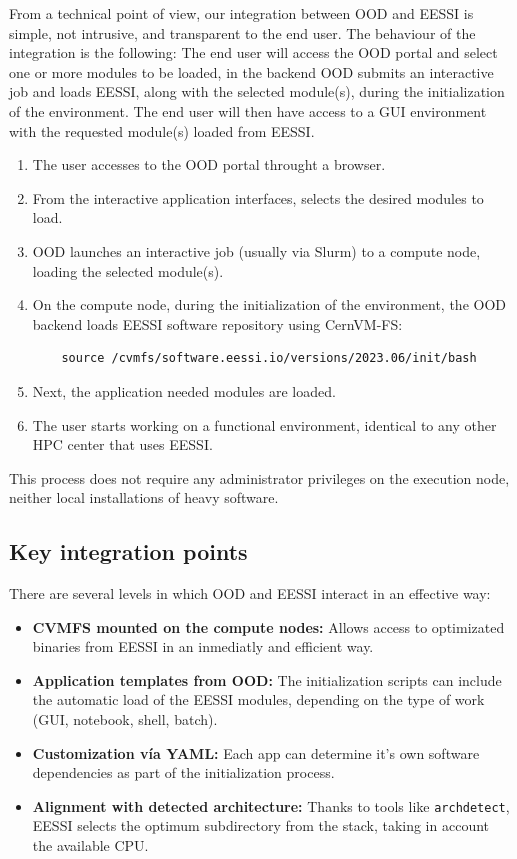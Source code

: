 \documentclass[11pt,a4paper]{article}
\begin{document}
From a technical point of view, our integration between OOD and EESSI is simple, not intrusive, and transparent to the end user. The behaviour of the integration is the following:
The end user will access the OOD portal and select one or more modules to be loaded, in the backend OOD submits an interactive job and loads EESSI, along with the selected module(s), during the initialization of the environment. 
The end user will then have access to a GUI environment with the requested module(s) loaded from EESSI. 
\begin{enumerate}
    \item The user accesses to the OOD portal throught a browser.
    \item From the interactive application interfaces, selects the desired modules to load. 
    \item OOD launches an interactive job (usually via Slurm) to a compute node, loading the selected module(s).
    \item On the compute node, during the initialization of the environment, the OOD backend loads EESSI software repository using CernVM-FS:
    
    \begin{verbatim}
    source /cvmfs/software.eessi.io/versions/2023.06/init/bash
    \end{verbatim}

    \item Next, the application needed modules are loaded.    
    \item The user starts working on a functional environment, identical to any other HPC center that uses EESSI.
\end{enumerate}

This process does not require any administrator privileges on the execution node, neither local installations of heavy software. 

\subsection{Key integration points}

There are several levels in which OOD and EESSI interact in an effective way:

\begin{itemize}
    \item \textbf{CVMFS mounted on the compute nodes:} Allows access to optimizated binaries from EESSI in an inmediatly and efficient way.
    \item \textbf{Application templates from OOD:} The initialization scripts can include the automatic load of the EESSI modules, depending on the type of work (GUI, notebook, shell, batch).
    \item \textbf{Customization vía YAML:} Each app can determine it's own software dependencies as part of the initialization process.
    \item \textbf{Alignment with detected architecture:} Thanks to tools like \texttt{archdetect}, EESSI selects the optimum subdirectory from the stack, taking in account the available CPU.
\end{itemize}
\end{document}
